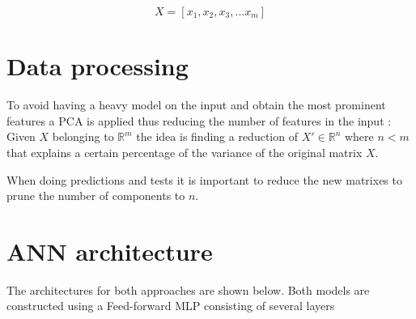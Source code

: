 $$X = [x_1, x_2, x_3, ... x_m]$$


\section{Data processing}
\label{data processing}

To avoid having a heavy model on the input and obtain the most prominent features a PCA is applied thus reducing the number of features in the input \cite{pca} \cite{Minka2001}: 
Given $X$ belonging to $\mathbb{R}^m$ the idea is finding a reduction of $ X' \in \mathbb{R}^n$ where $n < m$ that explains a certain percentage of the variance of the original matrix $X$.

When doing predictions and tests it is important to reduce the new matrixes to prune the number of components to $n$. 

\newpage

\section{ANN architecture}
The architectures for both approaches are shown below. 
Both models are constructed using a Feed-forward MLP consisting of several layers

